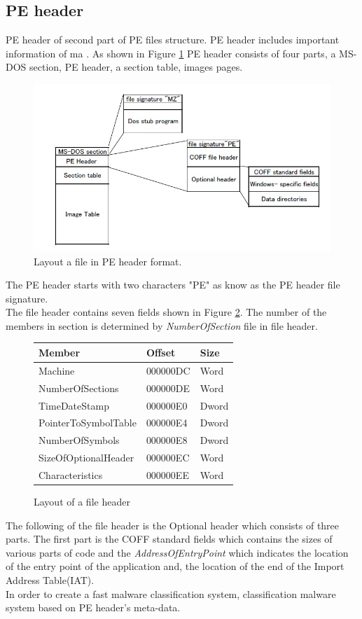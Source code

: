 \subsection{PE header}
PE header of second part of PE files structure. PE header includes important information of ma . As shown in Figure \ref{fig:peheader} PE header consists of four parts, a MS-DOS section, PE header, a section table, images pages.\\
\begin{figure}[httb]
\centering
\includegraphics[width=1\textwidth]{graph/peheader1.jpg}
\caption{Layout a file in PE header format.}
\label{fig:peheader}
\end{figure}
\newline
The PE header starts with two characters "PE" as know as the PE header file signature.\\
The file header contains seven fields shown in Figure \ref{fig:fileheader}. The number of the members in section is determined by \emph{NumberOfSection} file in file header. 
\begin{figure}[h!]
\begin{center}
\begin{tabular}{ l | l | l }
Member & Offset & Size\\ \hline
Machine & 000000DC & Word\\ 
NumberOfSections & 000000DE & Word\\ 
TimeDateStamp & 000000E0 & Dword\\ 
PointerToSymbolTable & 000000E4 & Dword\\ 
NumberOfSymbols & 000000E8 & Dword\\ 
SizeOfOptionalHeader & 000000EC & Word\\ 
Characteristics & 000000EE & Word\\
\end{tabular}
\end{center}
\caption{Layout of a file header}
\label{fig:fileheader}
\end{figure}
\newline
The following of the file header is the Optional header which consists of three parts. The first part is the COFF standard fields which contains the sizes of various parts of code and the \emph{AddressOfEntryPoint} which indicates the location of the entry point of the application and, the location of the end of the Import Address Table(IAT).\\ 
In order to create a fast malware classification system, classification malware system based on PE header's meta-data.\\
